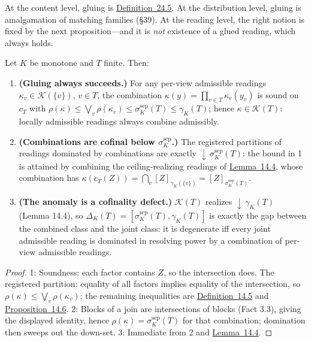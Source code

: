 \begin{thmrem}

At the content level, gluing is \hyperlink{stmt:24.5}{Definition~24.5}. At the distribution level, gluing is amalgamation of matching families (§39). At the reading level, the right notion is fixed by the next proposition---\hspace{0pt}and it is \emph{not} existence of a glued reading, which always holds.
\end{thmrem}

\begin{thmplain}

Let \(K\) be monotone and \(T\) finite. Then:

\begin{enumerate}
\def\labelenumi{\arabic{enumi}.}
\tightlist
\item
  \textbf{(Gluing always succeeds.)} For any per-view admissible readings \(\kappa_v \in \mathcal{K}(\{v\})\), \(v \in T\), the combination \(\kappa(y) = \prod_{v \in T} \kappa_v(y_v)\) is sound on \(c_T\) with \(\rho(\kappa) \le \bigvee_{v} \rho(\kappa_v) \le \sigma^{\mathrm{sep}}_K(T) \le \gamma_K(T)\); hence \(\kappa \in \mathcal{K}(T)\): locally admissible readings always combine admissibly.
\item
  \textbf{(Combinations are cofinal below \(\sigma^{\mathrm{sep}}_K\).)} The registered partitions of readings dominated by combinations are exactly \({\downarrow}\,\sigma^{\mathrm{sep}}_K(T)\): the bound in 1 is attained by combining the ceiling-realizing readings of \hyperlink{stmt:14.4}{Lemma~14.4}, whose combination has \(\kappa(c_T(Z)) = \bigcap_v [Z]_{\gamma_K(\{v\})} = [Z]_{\sigma^{\mathrm{sep}}_K(T)}\).
\item
  \textbf{(The anomaly is a cofinality defect.)} \(\mathcal{K}(T)\) realizes \({\downarrow}\,\gamma_K(T)\) (Lemma 14.4), so \(\Delta_K(T) = [\sigma^{\mathrm{sep}}_K(T), \gamma_K(T)]\) is exactly the gap between the combined class and the joint class: it is degenerate iff every joint admissible reading is dominated in resolving power by a combination of per-view admissible readings.
\end{enumerate}
\end{thmplain}

\begin{proof}

1: Soundness: each factor contains \(Z\), so the intersection does. The registered partition: equality of all factors implies equality of the intersection, so \(\rho(\kappa) \le \bigvee_v \rho(\kappa_v)\); the remaining inequalities are \hyperlink{stmt:14.5}{Definition~14.5} and \hyperlink{stmt:14.6}{Proposition~14.6}. 2: Blocks of a join are intersections of blocks (Fact 3.3), giving the displayed identity, hence \(\rho(\kappa) = \sigma^{\mathrm{sep}}_K(T)\) for that combination; domination then sweeps out the down-set. 3: Immediate from 2 and \hyperlink{stmt:14.4}{Lemma~14.4}.
\end{proof}

